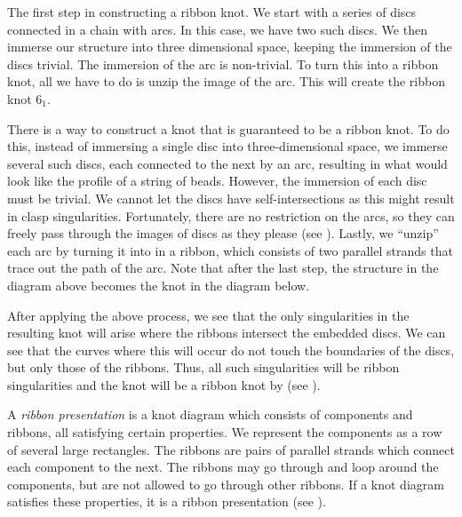\begin{paper}
{The first step in constructing a ribbon knot.
We start with a series of discs connected in a chain with arcs.
In this case, we have two such discs.
We then immerse our structure into three dimensional space, keeping the
immersion of the discs trivial.
The immersion of the arc is non-trivial.
To turn this into a ribbon knot, all we have to do is unzip the image of the
arc.
This will create the ribbon knot $6_1$.}

There is a way to construct a knot that is guaranteed to be a ribbon knot.
To do this, instead of immersing a single disc into three-dimensional space, we
immerse several such discs, each connected to the next by an arc, resulting in
what would look like the profile of a string of beads.
However, the immersion of each disc must be trivial.
We cannot let the discs have self-intersections as this might result in clasp
singularities.
Fortunately, there are no restriction on the arcs, so they can freely pass
through the images of discs as they please (see \figImmersion).
Lastly, we ``unzip'' each arc by turning it into in a ribbon, which consists of
two parallel strands that trace out the path of the arc.
Note that after the last step, the structure in the diagram above becomes the
knot in the diagram below.

After applying the above process, we see that the only singularities in the
resulting knot will arise where the ribbons intersect the embedded discs.
We can see that the curves where this will occur do not touch the boundaries of
the discs, but only those of the ribbons.
Thus, all such singularities will be ribbon singularities and the knot will be a
ribbon knot by  (see \figSingularities).


A \textit{ribbon presentation} is a knot diagram which consists of components
and ribbons, all satisfying certain properties.
We represent the components as a row of several large rectangles.
The ribbons are pairs of parallel strands which connect each component to the
next.
The ribbons may go through and loop around the components, but are not allowed
to go through other ribbons.
If a knot diagram satisfies these properties, it is a ribbon presentation (see
\figPresentation).


\end{paper}
